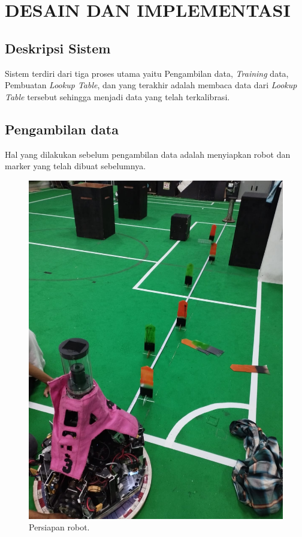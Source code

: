 \chapter{DESAIN DAN IMPLEMENTASI}
\label{chap:desainimplementasi}

\section{Deskripsi Sistem}
\label{sec:deskripsisistem}

Sistem terdiri dari tiga proses utama yaitu Pengambilan data, \textit{Training} data, Pembuatan \textit{Lookup Table}, dan yang terakhir adalah membaca data dari \textit{Lookup Table} tersebut sehingga menjadi data yang telah terkalibrasi.

\section{Pengambilan data
  \label{sec:pengambilandata}}

Hal yang dilakukan sebelum pengambilan data adalah menyiapkan robot dan marker yang telah dibuat sebelumnya. 

\begin{figure}[H]
  \centering
  \includegraphics[scale=0.20]{gambar/ambil_data.jpeg}
  \caption{Persiapan robot.}
  \label{fig:persiapanrobot}
\end{figure}

